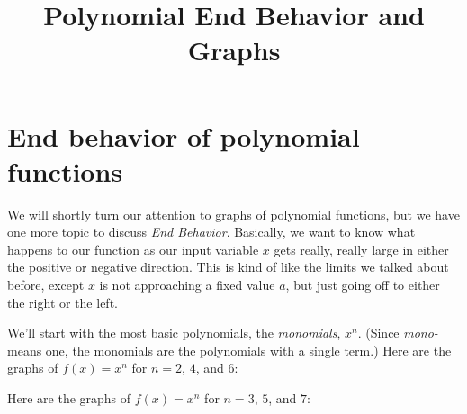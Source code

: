 \documentclass{ximera}
\title{Polynomial End Behavior and Graphs}
\begin{document}
\begin{abstract} \end{abstract}
\maketitle



\section{End behavior of polynomial functions}
We will shortly turn our attention to graphs of polynomial functions, but we have one more topic to discuss \emph{End Behavior}.
Basically, we want to know what happens to our function as our input variable $x$ gets really, really large in either the positive or negative direction.
This is kind of like the limits we talked about before, except $x$ is not approaching a fixed value $a$, but just going off to either the right or the left.

We'll start with the most basic polynomials, the \emph{monomials}, $x^n$.  (Since \emph{mono-} means one, the monomials are the polynomials with a single term.)
Here are the graphs of $f(x)=x^n$ for $n = 2$, $4$, and $6$:
	\begin{center}
	\end{center}

	
Here are the graphs of $f(x)=x^n$ for $n = 3$, $5$, and $7$:
	\begin{center}
	\end{center}
\end{document}

